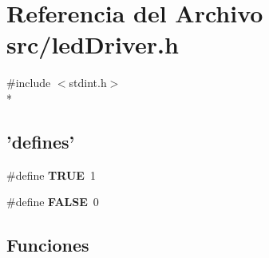 \section{Referencia del Archivo src/led\-Driver.h}
\label{led_driver_8h}
{\ttfamily \#include $<$stdint.\-h$>$}\\*
\subsection*{'defines'}
\begin{DoxyCompactItemize}
\item 
\#define {\bf T\-R\-U\-E}~1
\item 
\#define {\bf F\-A\-L\-S\-E}~0
\end{DoxyCompactItemize}
\subsection*{Funciones}
